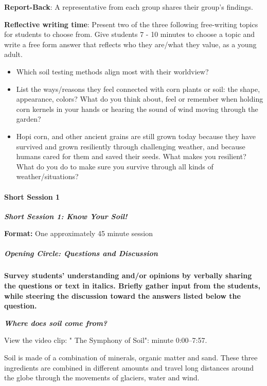 \documentclass[12pt,]{article}
\providecommand{\tightlist}{%
  \setlength{\itemsep}{0pt}\setlength{\parskip}{0pt}}
\let\oldparagraph\paragraph
\renewcommand{\paragraph}[1]{\oldparagraph{#1}\mbox{}}
\let\oldsubparagraph\subparagraph
\renewcommand{\subparagraph}[1]{\oldsubparagraph{#1}\mbox{}}
\begin{document}
\textbf{Report-Back}: A representative from each group shares their group's findings.

\textbf{Reflective writing time}: Present two of the three following free-writing topics for students to choose from. Give students 7 - 10 minutes to choose a topic and write a free form answer that reflects who they are/what they value, as a young adult.

\begin{itemize}
\tightlist
\item
  Which soil testing methods align most with their worldview?
\item
  List the ways/reasons they feel connected with corn plants or soil: the shape, appearance, colors? What do you think about, feel or remember when holding corn kernels in your hands or hearing the sound of wind moving through the garden?
\item
  Hopi corn, and other ancient grains are still grown today because they have survived and grown resiliently through challenging weather, and because humans cared for them and saved their seeds. What makes you resilient? What do you do to make sure you survive through all kinds of weather/situations?
\end{itemize}

\hypertarget{short-session-1-2}{%
\paragraph{Short Session 1}\label{short-session-1-2}}

\textbf{\emph{Short Session 1: Know Your Soil!}}

\textbf{Format:} One approximately 45 minute session

\hypertarget{opening-circle-questions-and-discussion-1}{%
\subparagraph{Opening Circle: Questions and Discussion}\label{opening-circle-questions-and-discussion-1}}

\textbf{Survey students' understanding and/or opinions by verbally sharing the questions or text in italics. Briefly gather input from the students, while steering the discussion toward the answers listed below the question.}

\textbf{\emph{Where does soil come from?}}

View the video clip: " The Symphony of Soil": minute 0:00--7:57.

Soil is made of a combination of minerals, organic matter and sand. These three ingredients are combined in different amounts and travel long distances around the globe through the movements of glaciers, water and wind.
\end{document}
